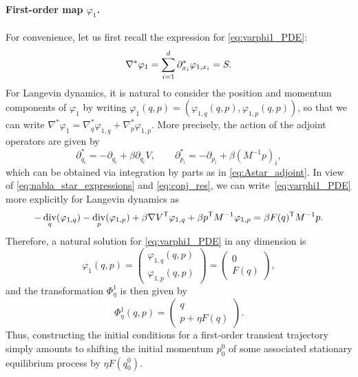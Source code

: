 \documentclass[11pt]{article}
\renewcommand{\t}{\mathsf T}
\DeclareMathOperator{\Div}{div}
\theoremstyle{definition}
\let\oldparagraph=\paragraph
\renewcommand\paragraph[1]{\oldparagraph{#1.}}
\begin{document}
\paragraph{First-order map $\varphi_1$} For convenience, let us first recall the expression for \eqref{eq:varphi1_PDE}: 
\begin{equation}
\notag
	\nabla^*\varphi_1 = \sum_{i=1}^d \partial_{x_i}^* \varphi_{1,x_i} = S.
 \end{equation}
For Langevin dynamics, it is natural to consider the position and momentum components of $\varphi_1$ by writing $\varphi_1(q,p) = (\varphi_{1,q}(q,p), \varphi_{1,p}(q,p))$, so that we can write $\nabla^*\varphi_1 = \nabla^*_q\varphi_{1,q} + \nabla^*_p\varphi_{1,p}$. More precisely, the action of the adjoint operators are given by
\begin{equation}
	\partial^*_{q_i} = - \partial_{q_i} + \beta\partial_{q_i} V , \qquad \partial^*_{p_i} = - \partial_{p_i} + \beta (M^{-1}p)_i,
	\label{eq:nabla_star_expressions}
\end{equation}
which can be obtained via integration by parts as in \eqref{eq:Astar_adjoint}. In view of \eqref{eq:nabla_star_expressions} and \eqref{eq:conj_res}, we can write~\eqref{eq:varphi1_PDE} more explicitly for Langevin dynamics as
\begin{equation}
\notag
	-\Div_q(\varphi_{1,q}) - \Div_p(\varphi_{1,p}) + \beta \nabla V^\t \varphi_{1,q} + \beta p^\t M^{-1} \varphi_{1,p} = \beta F(q)^\t M^{-1} p.
\end{equation}
Therefore, a natural solution for \eqref{eq:varphi1_PDE} in any dimension is
\begin{equation}
	\varphi_1(q,p) = \begin{pmatrix}
 	\varphi_{1,q}(q,p) \\ \varphi_{1,p}(q,p)
 	\end{pmatrix} =
	\begin{pmatrix}
 	0 \\ F(q)
 	\end{pmatrix},
 	\label{eq:varphi1_sol}
\end{equation}
and the transformation $\Phi^1_\eta$ is then given by
\begin{equation}
	\Phi_\eta^1(q,p) = 
	\begin{pmatrix}
 	  q \\ p + \eta F(q)
 	\end{pmatrix}.
  \label{eq:Phi1_map}
\end{equation}
Thus, constructing the initial conditions for a first-order transient trajectory simply amounts to shifting the initial momentum $p_0^0$ of some associated stationary equilibrium process by $\eta F(q_0^0)$.
\end{document}
